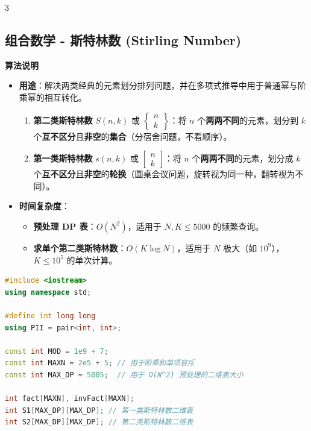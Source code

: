 \documentclass[10pt,landscape,a4paper]{article}
\begin{document}
\begin{multicols*}{3}
\subsection*{组合数学 - 斯特林数 (Stirling Number)}
\par\addvspace{0.7ex}\noindent\textbf{算法说明}\par\nobreak
\begin{itemize}
\item \textbf{用途}：解决两类经典的元素划分排列问题，并在多项式推导中用于普通幂与阶乘幂的相互转化。
\begin{enumerate}[start=1]
\item \textbf{第二类斯特林数} $S(n,k)$ 或 $\begin{Bmatrix} n \\ k \end{Bmatrix}$：将 $n$ 个\textbf{两两不同}的元素，划分到 $k$ 个\textbf{互不区分}且\textbf{非空}的\textbf{集合}（分宿舍问题，不看顺序）。
\item \textbf{第一类斯特林数} $s(n,k)$ 或 $\begin{bmatrix} n \\ k \end{bmatrix}$：将 $n$ 个\textbf{两两不同}的元素，划分成 $k$ 个\textbf{互不区分}且\textbf{非空}的\textbf{轮换}（圆桌会议问题，旋转视为同一种，翻转视为不同）。
\end{enumerate}
\item \textbf{时间复杂度}：
\begin{itemize}
\item \textbf{预处理 DP 表}：$O(N^2)$，适用于 $N, K \le 5000$ 的频繁查询。
\item \textbf{求单个第二类斯特林数}：$O(K \log N)$，适用于 $N$ 极大（如 $10^9$），$K \le 10^5$ 的单次计算。
\end{itemize}
\end{itemize}
\par{}\par
\begin{lstlisting}[language=C++]
#include <iostream>
using namespace std;

#define int long long
using PII = pair<int, int>;

const int MOD = 1e9 + 7;
const int MAXN = 2e5 + 5; // 用于阶乘和单项容斥
const int MAX_DP = 5005;  // 用于 O(N^2) 预处理的二维表大小

int fact[MAXN], invFact[MAXN];
int S1[MAX_DP][MAX_DP]; // 第一类斯特林数二维表
int S2[MAX_DP][MAX_DP]; // 第二类斯特林数二维表


\end{lstlisting}
\end{multicols*}
\end{document}

